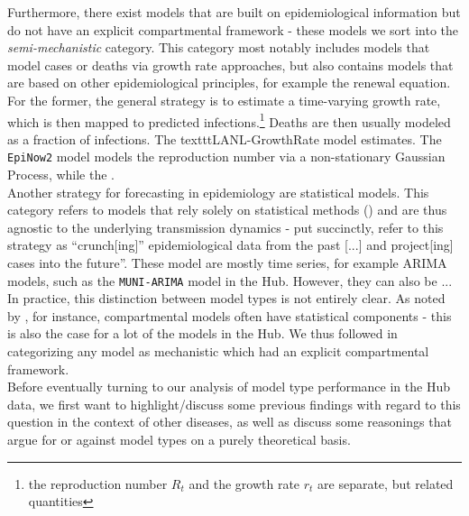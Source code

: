Furthermore, there exist models that are built on epidemiological information but do not have an explicit compartmental framework - these models we sort into the \textit{semi-mechanistic} category. This category most notably includes models that model cases or deaths via growth rate approaches, but also contains models that are based on other epidemiological principles, for example the renewal equation. For the former, the general strategy is to estimate a time-varying growth rate, which is then mapped to predicted infections.\footnote{the reproduction number $R_t$ and the growth rate $r_t$ are separate, but related quantities} Deaths are then usually modeled as a fraction of infections. The texttt{LANL-GrowthRate} model estimates. The \texttt{EpiNow2} model models the reproduction number via a non-stationary Gaussian Process,  while the . \\
Another strategy for forecasting in epidemiology are statistical models. %
This category refers to models that rely solely on statistical methods () and are thus agnostic to the underlying transmission dynamics - put succinctly, \cite{holmdahl_wrong_2020} refer to this strategy as ``crunch[ing]'' epidemiological data from the past [...] and project[ing] cases into the future''. These model are mostly time series, for example ARIMA models, such as the \texttt{MUNI-ARIMA} model in the Hub. However, they can also be ...\\
In practice, this distinction between model types is not entirely clear. As noted by \cite{reich_collaborative_2019}, for instance, compartmental models often have statistical components - this is also the case for a lot  of the models in the Hub. We thus followed \cite{reich_collaborative_2019} in categorizing any model as mechanistic which had an explicit compartmental framework.\\
Before eventually turning to our analysis of model type performance in the Hub data, we first want to highlight/discuss some previous findings with regard to this question in the context of other diseases, as well as discuss some reasonings that argue for or against model types on a purely theoretical basis.\\
